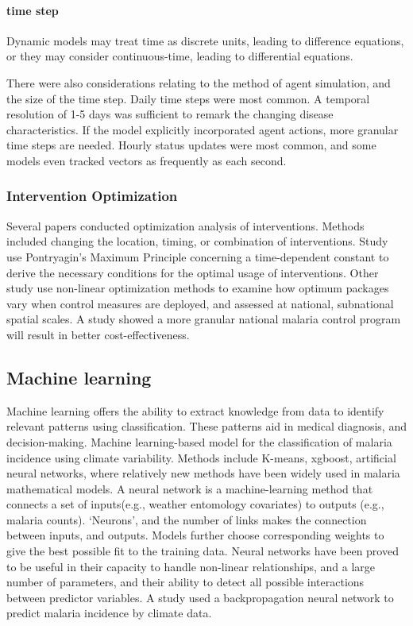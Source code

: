 \documentclass[a4paper, 12pt, twoside]{article}
\begin{document}
\paragraph{time step}%
\label{par:time_step}
Dynamic models may treat time as discrete units, leading to difference equations, or they may consider continuous-time, leading to differential equations.

There were also considerations relating to the method of agent simulation, and the size of the time step.
Daily time steps were most common.
A temporal resolution of 1-5 days was sufficient to remark the changing disease characteristics.
If the model explicitly incorporated agent actions, more granular time steps are needed.
Hourly status updates were most common, and some models even tracked vectors as frequently as each second.

\subsubsection{Intervention Optimization}
Several papers\cite{Tchoumi2020,Smith2008,Cameron2015,Winskill2019} conducted optimization analysis of interventions.
Methods included changing the location, timing, or combination of interventions.
Study use Pontryagin’s Maximum Principle\cite{Tchoumi2020} concerning a time-dependent constant to derive the necessary conditions for the optimal usage of interventions.
Other study use non-linear optimization methods\cite{Walker2016} to examine how optimum packages vary when control measures are deployed, and assessed at national, subnational spatial scales.
A study showed a more granular national malaria control program will result in better cost-effectiveness\cite{Walker2016}.

\subsection{Machine learning}%
\label{sub:machine_learning}
Machine learning offers the ability to extract knowledge from data to identify relevant patterns using classification. These patterns aid in medical diagnosis, and decision-making.
Machine learning-based model for the classification of malaria incidence using climate variability.
Methods include K-means, \gls{xgboost}, artificial neural networks, where relatively new methods have been widely used in malaria mathematical models.
A neural network is a machine-learning method that connects a set of inputs(e.g., weather entomology covariates) to outputs (e.g., malaria counts).
‘Neurons', and the number of links makes the connection between inputs, and outputs.
Models further choose corresponding weights to give the best possible fit to the training data.
Neural networks have been proved to be useful in their capacity to handle non-linear relationships, and a large number of parameters, and their ability to detect all possible interactions between predictor variables.
A study\cite{Verma2020} used a backpropagation neural network to predict malaria incidence by climate data.
\end{document}
